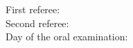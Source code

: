 {\clearpage
\restoregeometry
	  
	  
\thispagestyle{empty}
\enlargethispage{0.55cm}
	  
\vspace*{\fill}
%
\begin{flushleft}
  \large\onehalfspacing
  First referee: \FirstReferee{}\\
  Second referee: \SecondReferee{}\\
  Day of the oral examination: 
\end{flushleft}

\clearpage
  
}
	
	